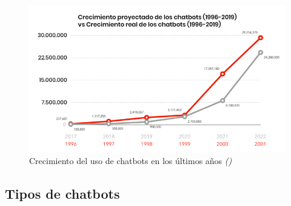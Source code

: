\begin{figure}[!ht]
    \centering
    \includegraphics[width=1\textwidth]{imagenes/uso_chatbots.png}
    \caption{ Crecimiento del uso de chatbots en los últimos años \textit{(\cite{crecimientochatbots})} }
    \label{fig:crecimiento}
\end{figure}

\subsection{Tipos de chatbots}

